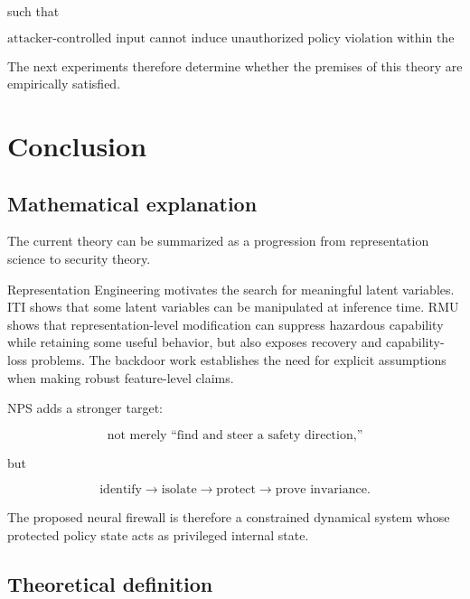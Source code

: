 \documentclass[11pt]{article}
\begin{document}
such that

\begin{equation}
\boxed{
\text{attacker-controlled input cannot induce unauthorized policy
violation within the stated threat model.}
}
\end{equation}

The next experiments therefore determine whether the premises of this theory
are empirically satisfied.

\section{Conclusion}

\subsection*{Mathematical explanation}

The current theory can be summarized as a progression from representation
science to security theory.

Representation Engineering motivates the search for meaningful latent
variables. ITI shows that some latent variables can be manipulated at
inference time. RMU shows that representation-level modification can suppress
hazardous capability while retaining some useful behavior, but also exposes
recovery and capability-loss problems. The backdoor work establishes the need
for explicit assumptions when making robust feature-level claims.

NPS adds a stronger target:

\begin{equation}
\text{not merely ``find and steer a safety direction,''}
\end{equation}

but

\begin{equation}
\boxed{
\text{identify}
\rightarrow
\text{isolate}
\rightarrow
\text{protect}
\rightarrow
\text{prove invariance}.
}
\end{equation}

The proposed neural firewall is therefore a constrained dynamical system
whose protected policy state acts as privileged internal state.

\subsection*{Theoretical definition}
\end{document}
